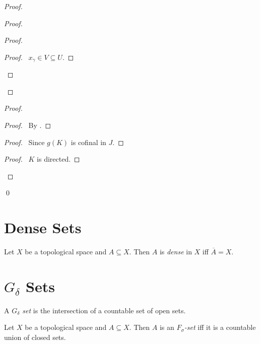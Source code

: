 \begin{proof}
\begin{proof}
\begin{proof}
\begin{proof}
       \pf\ $x_\gamma \in V \subseteq U$.
     \end{proof}
   \end{proof}
 \end{proof}
 \begin{proof}
   \begin{proof}
     \pf\ By .
   \end{proof}
   \begin{proof}
     \pf\ Since $g(K)$ is cofinal in $J$.
   \end{proof}
   \begin{proof}
     \pf\ $K$ is directed.
   \end{proof}
 \end{proof}
 \qed
\end{proof}

\section{Dense Sets}

  \begin{df}[Dense]
  Let $X$ be a topological space and $A \subseteq X$. Then $A$ is
  \emph{dense} in $X$ iff $\overline{A} = X$.
\end{df}

\section{$G_\delta$ Sets}

  \begin{df}
  A \emph{$G_\delta$ set} is the intersection of a countable set of open sets.
\end{df}

\begin{df}
  Let $X$ be a topological space and $A \subseteq X$. Then $A$ is an
  \emph{$F_\sigma$-set} iff it is a countable union of closed sets.
\end{df}

